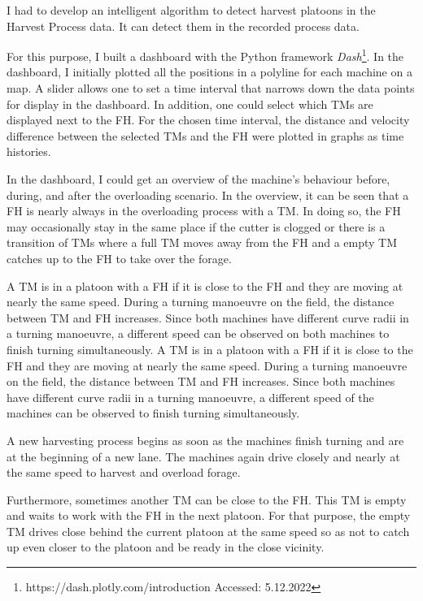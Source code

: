 \documentclass[]{nsm-thesis}
\begin{document}
I had to develop an intelligent algorithm to detect harvest platoons in the Harvest Process data. It can detect them in the recorded process data.

For this purpose, I built a dashboard with the Python framework \textit{Dash}\footnote{https://dash.plotly.com/introduction Accessed: 5.12.2022}. In the dashboard, I initially plotted all the positions in a polyline for each machine
on a map. A slider allows one to set a time interval that narrows down the data
points for display in the dashboard. In addition, one could select which \ac{TM}s are displayed next to the \ac{FH}. For the chosen time interval, the distance and velocity difference between the selected \ac{TM}s and the \ac{FH} were plotted in graphs as time histories. 

In the dashboard, I could get an overview of the machine's behaviour 
before, during, and after the overloading scenario.
In the overview, it can be seen that a \ac{FH} is nearly always in the overloading process with a \ac{TM}. In doing so, the \ac{FH} may occasionally stay in the same place if the cutter is clogged or there is a transition of \ac{TM}s where a full \ac{TM} moves away from the \ac{FH} and  a  empty \ac{TM} catches up to the \ac{FH} to take over the forage.

A \ac{TM} is in a platoon with a  \ac{FH} if it is close to the \ac{FH} and they are moving at nearly the same speed. During a turning manoeuvre on the field, the distance between \ac{TM} and \ac{FH} increases. Since both machines have different curve radii in a turning manoeuvre, a different speed can be observed on both machines to finish turning simultaneously.
A \ac{TM} is in a platoon with a  \ac{FH} if it is close to the \ac{FH} and they are moving at nearly the same speed. During a turning manoeuvre on the field, the distance between \ac{TM} and \ac{FH} increases. Since both machines have different curve radii in a turning manoeuvre, a different speed of the machines can be observed to finish turning simultaneously.

A new harvesting process begins as soon as the machines finish turning and are at the beginning of a new lane.
The machines again drive closely and nearly at the same speed to harvest and overload forage.

Furthermore, sometimes another \ac{TM} can be close to the \ac{FH}. This \ac{TM} is empty and waits to work with the \ac{FH} in the next platoon. For that purpose, the empty \ac{TM} drives close behind the current platoon at the same speed so as not to catch up even closer to the platoon and be ready in the close vicinity.
\end{document}
